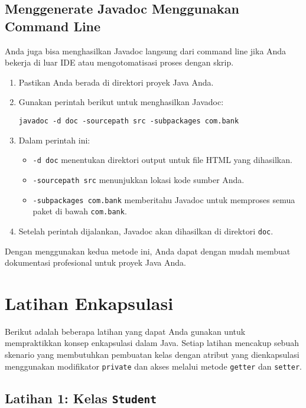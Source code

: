 \subsection{Menggenerate Javadoc Menggunakan Command Line}

Anda juga bisa menghasilkan Javadoc langsung dari command line jika Anda bekerja di luar IDE atau mengotomatisasi proses dengan skrip.
%
\begin{enumerate} \item Pastikan Anda berada di direktori proyek Java Anda. \item Gunakan perintah berikut untuk menghasilkan Javadoc:
%
\begin{lstlisting}[style=JavaStyle]
javadoc -d doc -sourcepath src -subpackages com.bank 
\end{lstlisting}

\item Dalam perintah ini:
\begin{itemize}
\item \texttt{-d doc} menentukan direktori output untuk file HTML yang dihasilkan.
\item \texttt{-sourcepath src} menunjukkan lokasi kode sumber Anda.
\item \texttt{-subpackages com.bank} memberitahu Javadoc untuk memproses semua paket di bawah \texttt{com.bank}.
\end{itemize}
\item Setelah perintah dijalankan, Javadoc akan dihasilkan di direktori \texttt{doc}.
\end{enumerate}
%
Dengan menggunakan kedua metode ini, Anda dapat dengan mudah membuat dokumentasi profesional untuk proyek Java Anda.


\section{Latihan Enkapsulasi}

Berikut adalah beberapa latihan yang dapat Anda gunakan untuk mempraktikkan konsep enkapsulasi dalam Java. Setiap latihan mencakup sebuah skenario yang membutuhkan pembuatan kelas dengan atribut yang dienkapsulasi menggunakan modifikator \texttt{private} dan akses melalui metode \texttt{getter} dan \texttt{setter}.

\subsection{Latihan 1: Kelas \texttt{Student}}

